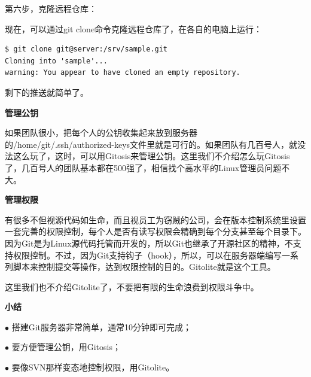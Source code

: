 \documentclass[•]{article}
\begin{document}
\begin{CJK}{UTF8}{gbsn}
第六步，克隆远程仓库：

\qquad 现在，可以通过git clone命令克隆远程仓库了，在各自的电脑上运行：
\begin{lstlisting}
$ git clone git@server:/srv/sample.git
Cloning into 'sample'...
warning: You appear to have cloned an empty repository.
\end{lstlisting}
剩下的推送就简单了。

\textbf{管理公钥}

\qquad 如果团队很小，把每个人的公钥收集起来放到服务器的/home/git/.ssh/authorized-keys文件里就是可行的。如果团队有几百号人，就没法这么玩了，这时，可以用Gitosis来管理公钥。这里我们不介绍怎么玩Gitosis了，几百号人的团队基本都在500强了，相信找个高水平的Linux管理员问题不大。

\textbf{管理权限}

\qquad 有很多不但视源代码如生命，而且视员工为窃贼的公司，会在版本控制系统里设置一套完善的权限控制，每个人是否有读写权限会精确到每个分支甚至每个目录下。因为Git是为Linux源代码托管而开发的，所以Git也继承了开源社区的精神，不支持权限控制。不过，因为Git支持钩子（hook），所以，可以在服务器端编写一系列脚本来控制提交等操作，达到权限控制的目的。Gitolite就是这个工具。

\qquad 这里我们也不介绍Gitolite了，不要把有限的生命浪费到权限斗争中。

\textbf{小结}

$\bullet$    搭建Git服务器非常简单，通常10分钟即可完成；

$\bullet$    要方便管理公钥，用Gitosis；

 $\bullet$   要像SVN那样变态地控制权限，用Gitolite。


\end{CJK}
\end{document}
